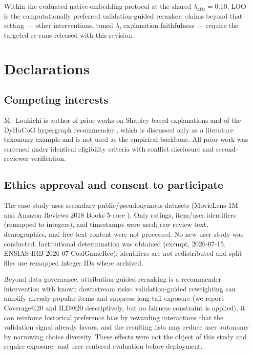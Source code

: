 \documentclass[pdflatex,sn-mathphys-num]{sn-jnl}
\begin{document}
Within the evaluated native-embedding protocol at the shared $\lambda_{\mathrm{attr}}=0.10$, LOO is the computationally preferred validation-guided reranker; claims beyond that setting --- other interventions, tuned $\lambda$, explanation faithfulness --- require the targeted re-runs released with this revision.



\section*{Declarations}

\subsection*{Competing interests}
M.\ Louhichi is author of prior works on Shapley-based explanations \cite{louhichi2023shapleyclustering,louhichi2025gametheoryxai} and of the DyHuCoG hypergraph recommender \cite{louhichi2026dyhucog}, which is discussed only as a literature taxonomy example and is not used as the empirical backbone. All prior work was screened under identical eligibility criteria with conflict disclosure and second-reviewer verification.

\subsection*{Ethics approval and consent to participate}
The case study uses secondary public/pseudonymous datasets (MovieLens-1M \cite{harper2015movielens} and Amazon Reviews 2018 Books 5-core \cite{ni2019justifying}). Only ratings, item/user identifiers (remapped to integers), and timestamps were used; raw review text, demographics, and free-text content were not processed. No new user study was conducted. Institutional determination was obtained (exempt, 2026-07-15, ENSIAS IRB 2026-07-CoalGameRec); identifiers are not redistributed and split files use remapped integer IDs where archived.

Beyond data governance, attribution-guided reranking is a recommender intervention with known downstream risks: validation-guided reweighting can amplify already-popular items and suppress long-tail exposure (we report Coverage@20 and ILD@20 descriptively, but no fairness constraint is applied), it can reinforce historical preference bias by rewarding interactions that the validation signal already favors, and the resulting lists may reduce user autonomy by narrowing choice diversity. These effects were not the object of this study and require exposure- and user-centered evaluation before deployment.
\end{document}
